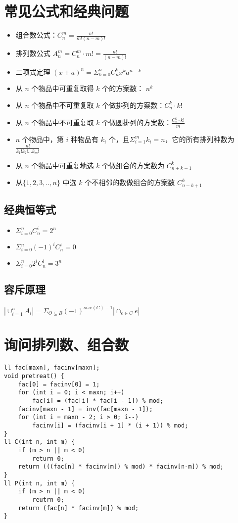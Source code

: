 \section{常见公式和经典问题}
\begin{itemize}
\item 组合数公式：$C_n^m = \frac{n!}{m!(n-m)!}$
\item 排列数公式 $A_n^m = C_n^m \cdot m! = \frac{n!}{(n-m)!}$
\item 二项式定理 $(x+a)^n = \Sigma_{k=0}^{n}C_n^kx^ka^{n-k}$
\item 从 $n$ 个物品中可重复取得 $k$ 个的方案数： $n^k$
\item 从 $n$ 个物品中不可重复取 $k$ 个做排列的方案数：$C_n^k \cdot k!$
\item 从 $n$ 个物品中不可重复取 $k$ 个做圆排列的方案数：$\frac{C_n^k \cdot k!}{m}$
\item $n$ 个物品中，第 $i$ 种物品有 $k_i$ 个，且$\Sigma_{i=1}^{m}k_i = n$，它的所有排列种数为 $\frac{n!}{k_1!k_2!...k_m!}$
\item 从 $n$ 个物品中可重复地选 $k$ 个做组合的方案数为 $C_{n+k-1}^k$
\item 从$\{1,2,3,..,n\}$ 中选 $k$ 个不相邻的数做组合的方案数 $C_{n-k+1}^k$
\end{itemize}

\subsection{经典恒等式}
\begin{itemize}
\item $\Sigma_{i=0}^{n}C_n^i = 2^n$
\item $\Sigma_{i=0}^{n}(-1)^iC_n^i = 0$
\item $\Sigma_{i=0}^{n}2^iC_n^i = 3^n$
\end{itemize}

\subsection{容斥原理}
\par $|\cup^{n}_{i=1}A_i|=\Sigma_{O \subseteq B}(-1)^{size(C)-1}|\cap_{e\in C}e|$

\section{询问排列数、组合数}
\begin{verbatim}
ll fac[maxn], facinv[maxn];
void pretreat() {
    fac[0] = facinv[0] = 1;
    for (int i = 0; i < maxn; i++)
        fac[i] = (fac[i] * fac[i - 1]) % mod;
    facinv[maxn - 1] = inv(fac[maxn - 1]);
    for (int i = maxn - 2; i > 0; i--)
        facinv[i] = (facinv[i + 1] * (i + 1)) % mod;
}
ll C(int n, int m) {
    if (m > n || m < 0)
        return 0;
    return (((fac[n] * facinv[m]) % mod) * facinv[n-m]) % mod;
}
ll P(int n, int m) {
    if (m > n || m < 0)
        reutrn 0;
    return (fac[n] * facinv[m]) % mod;
}
\end{verbatim}